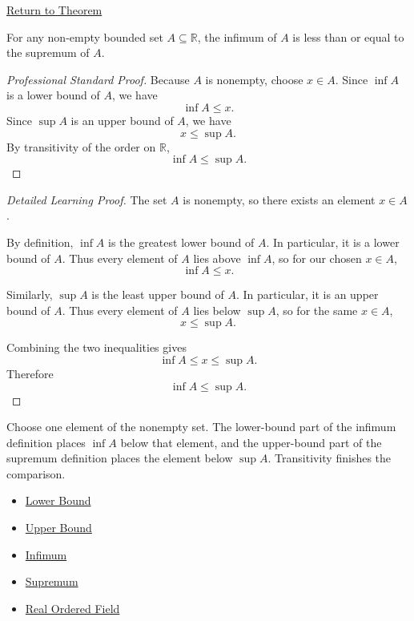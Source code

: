 \newpage
{}
\label{prf:infimum-less-than-supremum}

\begin{remark*}[Return]
\hyperref[thm:infimum-less-than-supremum]{Return to Theorem}
\end{remark*}


\begin{theorem*}
For any non-empty bounded set $A \subseteq \mathbb{R}$, the infimum of $A$ is less than or equal to the supremum of $A$.
\end{theorem*}

\begin{proof}[Professional Standard Proof]
\LRAProofBodyStart
Because \(A\) is nonempty, choose \(x\in A\). Since \(\inf A\) is a lower
bound of \(A\), we have
\[
\inf A\le x.
\]
Since \(\sup A\) is an upper bound of \(A\), we have
\[
x\le \sup A.
\]
By transitivity of the order on \(\mathbb{R}\),
\[
\inf A\le \sup A.
\]
\end{proof}

\begin{proof}[Detailed Learning Proof]
\LRAProofBodyStart
The set \(A\) is nonempty, so there exists an element \(x\in A\).

By definition, \(\inf A\) is the greatest lower bound of \(A\). In
particular, it is a lower bound of \(A\). Thus every element of \(A\) lies
above \(\inf A\), so for our chosen \(x\in A\),
\[
\inf A\le x.
\]

Similarly, \(\sup A\) is the least upper bound of \(A\). In particular, it is
an upper bound of \(A\). Thus every element of \(A\) lies below \(\sup A\), so
for the same \(x\in A\),
\[
x\le \sup A.
\]

Combining the two inequalities gives
\[
\inf A\le x\le \sup A.
\]
Therefore
\[
\inf A\le \sup A.
\]
\end{proof}

\begin{remark*}
Choose one element of the nonempty set. The lower-bound part of the infimum
definition places \(\inf A\) below that element, and the upper-bound part of
the supremum definition places the element below \(\sup A\). Transitivity
finishes the comparison.
\end{remark*}

\begin{dependencies}
\begin{itemize}
  \item \hyperref[def:lower-bound]{Lower Bound}
  \item \hyperref[def:upper-bound]{Upper Bound}
  \item \hyperref[def:infimum]{Infimum}
  \item \hyperref[def:supremum]{Supremum}
  \item \hyperref[def:real-ordered-field]{Real Ordered Field}
\end{itemize}
\end{dependencies}

\clearpage
